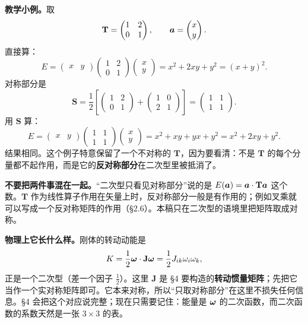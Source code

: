 \documentclass[11pt]{ctexart}
\newcommand{\ten}[1]{\mathbf{#1}}
\begin{document}
\textbf{教学小例。}取
\[
\ten T=\begin{pmatrix}1&2\\0&1\end{pmatrix},
\qquad
\vect a=\begin{pmatrix}x\\y\end{pmatrix}.
\]
直接算：
\[
E=\begin{pmatrix}x&y\end{pmatrix}
\begin{pmatrix}1&2\\0&1\end{pmatrix}
\begin{pmatrix}x\\y\end{pmatrix}
=x^2+2xy+y^2=(x+y)^2 .
\]
对称部分是
\[
\ten S=\frac12\left[
\begin{pmatrix}1&2\\0&1\end{pmatrix}
+\begin{pmatrix}1&0\\2&1\end{pmatrix}\right]
=\begin{pmatrix}1&1\\1&1\end{pmatrix}.
\]
用 $\ten S$ 算：
\[
E=\begin{pmatrix}x&y\end{pmatrix}
\begin{pmatrix}1&1\\1&1\end{pmatrix}
\begin{pmatrix}x\\y\end{pmatrix}
=x^2+xy+yx+y^2=x^2+2xy+y^2 .
\]
结果相同。这个例子特意保留了一个不对称的 $\ten T$，因为要看清：不是 $\ten T$ 的每个分量都不起作用，而是它的\textbf{反对称部分}在二次型里被抵消了。

\textbf{不要把两件事混在一起。}“二次型只看见对称部分”说的是 $E(\vect a)=\vect a\cdot\ten T\vect a$ 这个数。$\ten T$ 作为线性算子作用在矢量上时，反对称部分一般是有作用的；例如叉乘就可以写成一个反对称矩阵的作用（\S2.6）。本稿只在二次型的语境里把矩阵取成对称。

\textbf{物理上它长什么样。}刚体的转动动能是
\[
K=\frac12\vect\omega\cdot\ten J\vect\omega
=\frac12J_{ik}\omega_i\omega_k,
\]
正是一个二次型（差一个因子 $\frac12$）。这里 $\ten J$ 是 \S4 要构造的\textbf{转动惯量矩阵}；先把它当作一个实对称矩阵即可。它本来对称，所以“只取对称部分”在这里不损失任何信息。\S4 会把这个对应说完整；现在只需要记住：能量是 $\boldsymbol{\omega}$ 的二次函数，而二次函数的系数天然是一张 $3\times3$ 的表。
\end{document}
